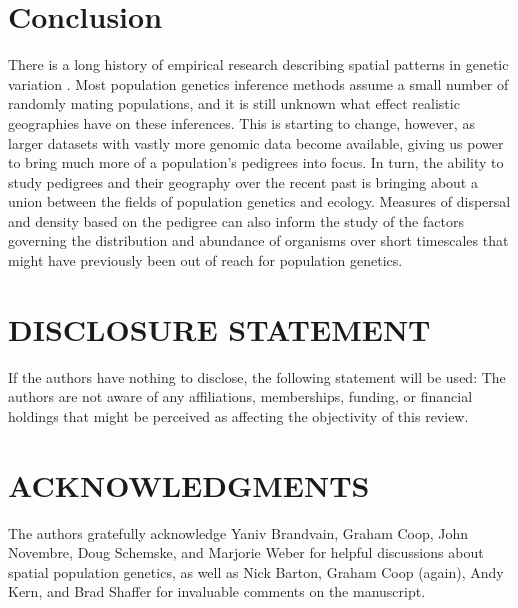 \documentclass{ar-1col}
\newcommand{\g}[1]{{\color{blue}{#1}}}
\begin{document}
\section*{Conclusion}

There is a long history of empirical research describing spatial patterns
in genetic variation \citep{dobzhansky1947,human_blood_types,landscape_genomics_review}.
Most population genetics inference methods assume a small number of randomly mating populations,
and it is still unknown what effect realistic geographies have on these inferences.
This is starting to change, however,
as larger datasets with vastly more genomic data become available,
giving us power to bring much more of a population's pedigrees into focus.
In turn, the ability to study pedigrees and their geography 
over the recent past is bringing about a union 
between the fields of population genetics and ecology.
Measures of dispersal and density based on the pedigree 
can also inform the study of the factors governing the 
distribution and abundance of organisms 
over short timescales that might have previously been out of reach for population genetics.
\g{As datasets, theory, and methods in spatial population genetics continue to progress, 
it will be exciting to explore further integration of evolution and ecology.}

\section*{DISCLOSURE STATEMENT}
If the authors have nothing to disclose, the following statement will be used: 
The authors are not aware of any affiliations, memberships, funding, or financial holdings 
that might be perceived as affecting the objectivity of this review.

\section*{ACKNOWLEDGMENTS}
The authors gratefully acknowledge 
Yaniv Brandvain, Graham Coop, 
John Novembre, Doug Schemske, 
and Marjorie Weber for helpful discussions about spatial population genetics,
as well as Nick Barton, Graham Coop (again), Andy Kern, and Brad Shaffer 
for invaluable comments on the manuscript.



\end{document}
